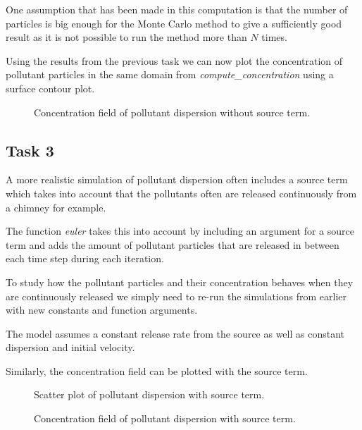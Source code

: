 \documentclass[11pt]{article}
\begin{document}
One assumption that has been made in this computation is that the number
of particles is big enough for the Monte Carlo method to give a
sufficiently good result as it is not possible to run the method more
than \(N\) times.

Using the results from the previous task we can now plot the
concentration of pollutant particles in the same domain from
\emph{compute\_concentration} using a surface contour plot.

    \begin{figure}[H]
    \centering
    \caption{Concentration field of pollutant dispersion without source term.}
    \end{figure}

\subsection{Task 3}\label{task-3}

A more realistic simulation of pollutant dispersion often includes a
source term which takes into account that the pollutants often are
released continuously from a chimney for example.

The function \emph{euler} takes this into account by including an
argument for a source term and adds the amount of pollutant particles
that are released in between each time step during each iteration.

To study how the pollutant particles and their concentration behaves
when they are continuously released we simply need to re-run the
simulations from earlier with new constants and function arguments.

The model assumes a constant release rate from the source as well as
constant dispersion and initial velocity.

Similarly, the concentration field can be plotted with the source term.

    \begin{figure}[H]
    \centering
    \caption{Scatter plot of pollutant dispersion with source term.}
    \end{figure}

    \begin{figure}[H]
    \centering
    \caption{Concentration field of pollutant dispersion with source term.}
    \end{figure}
\end{document}
